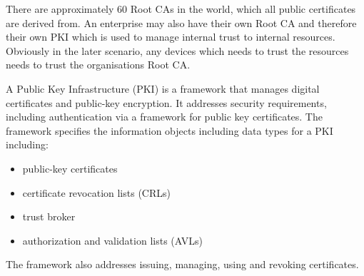 There are approximately 60 Root CAs in the world, which all public certificates are derived from. An enterprise may also have their own Root CA and therefore their own PKI which is used to manage internal trust to internal resources. Obviously in the later scenario, any devices which needs to trust the resources needs to trust the organisations Root CA. 

A Public Key Infrastructure (PKI) is a framework that manages digital certificates and public-key encryption. It addresses security requirements, including authentication via a framework for public key certificates. The framework specifies the information objects including data types for a PKI including:
\begin{itemize}
    \item public-key certificates
    \item certificate revocation lists (CRLs)
    \item trust broker
    \item authorization and validation lists (AVLs)
\end{itemize}

The framework also addresses issuing, managing, using and revoking certificates. 
